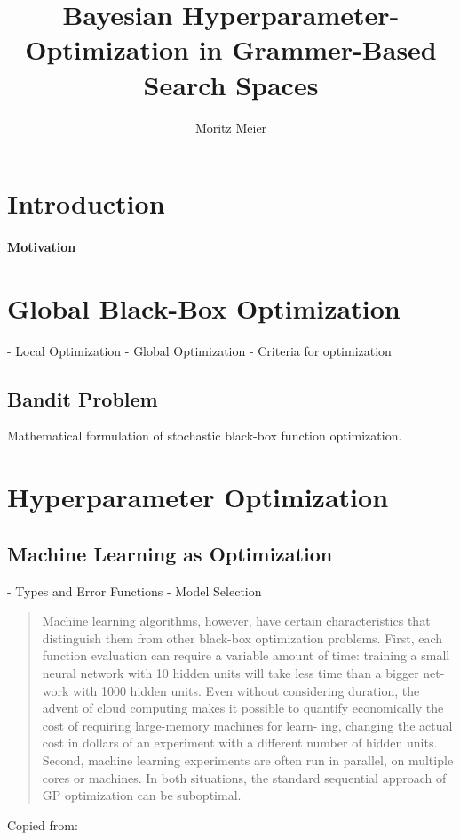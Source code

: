 \documentclass[english]{article}
\begin{document}
  

\title{Bayesian Hyperparameter-Optimization in Grammer-Based Search Spaces}
\author{Moritz Meier}
\maketitle
\tableofcontents
\newpage

\section{Introduction}
\paragraph{Motivation}

\section{Global Black-Box Optimization}
 - Local Optimization
 - Global Optimization
 - Criteria for optimization

\subsection{Bandit Problem}
Mathematical formulation of stochastic black-box function optimization.

\section{Hyperparameter Optimization}

\subsection{Machine Learning as Optimization}
 - Types and Error Functions
 - Model Selection

\begin{quote}
Machine learning algorithms, however, have certain characteristics that distinguish them from other
black-box optimization problems.  First, each function evaluation can require a variable amount of
time:  training a small neural network with 10 hidden units will take less time than a bigger net-
work with 1000 hidden units.  Even without considering duration, the advent of cloud computing
makes it possible to quantify economically the cost of requiring large-memory machines for learn-
ing, changing the actual cost in dollars of an experiment with a different number of hidden units.
Second, machine learning experiments are often run in parallel, on multiple cores or machines.  In
both situations, the standard sequential approach of GP optimization can be suboptimal.
\end{quote}
Copied from: \cite{snoek_practical_2012}
\end{document}
